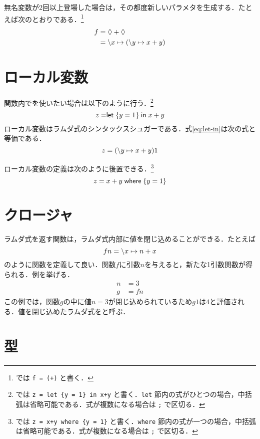 \documentclass[platex,a5paper,twoside,fleqn,draft]{jsbook}
\newcommand{\keyword}[1]{\textgt{\textbf{#1}}}
\begin{document}
無名変数が2回以上登場した場合は，その都度新しいパラメタを生成する．たとえば次のとおりである．\footnote{\haskell では \verb|f = (+)| と書く．}
\begin{align}
f&=\mathord{\lozenge}+\mathord{\lozenge}\\
&=\backslash x\mapsto(\backslash y\mapsto x+y)
\end{align}

\section{ローカル変数}

関数内で\keyword{ローカル変数}を使いたい場合は以下のように行う．\footnote{\haskell では \verb|z = let {y = 1} in x+y| と書く．\verb|let| 節内の式がひとつの場合，中括弧は省略可能である．式が複数になる場合は \verb|;| で区切る．}
\begin{equation}
z=\mathrel{\textsf{let}}\left\{y=1\right\}\mathrel{\textsf{in}}x+y
\label{eq:let-in}
\end{equation}
ローカル変数はラムダ式のシンタックスシュガーである．式\eqref{eq:let-in}は次の式と等価である．
\begin{equation}
z=(\backslash y\mapsto x+y)1
\end{equation}

ローカル変数の定義は次のように後置できる．\footnote{\haskell では \verb|z = x+y where {y = 1}| と書く．\verb|where| 節内の式が一つの場合，中括弧は省略可能である．式が複数になる場合は \verb|;| で区切る．}
\begin{equation}
z=x+y\mathrel{\textsf{where}}\left\{y=1\right\}
\end{equation}

\section{クロージャ}

ラムダ式を返す関数は，ラムダ式内部に値を閉じ込めることができる．たとえば
\begin{equation}
fn=\backslash x\mapsto n+x
\end{equation}
のように関数を定義して良い．関数$f$に引数$n$を与えると，新たな1引数関数が得られる．例を挙げる．
\begin{align}
n&=3\\
g&=fn
\end{align}
この例では，関数$g$の中に値$n=3$が閉じ込められているため$g1$は$4$と評価される．値を閉じ込めたラムダ式を\keyword{クロージャ}と呼ぶ．

\section{型}
\end{document}
